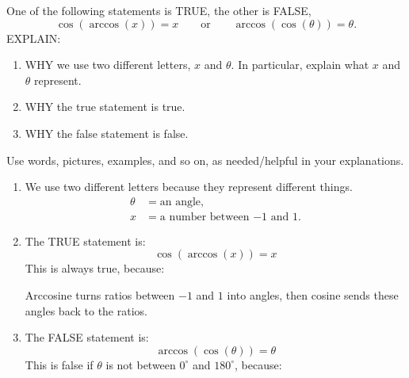 \documentclass[noauthor,nooutcomes,handout,hints]{ximera}
\begin{document}
\begin{question}
  One of the following statements is TRUE, the other is FALSE,
  \[
  \cos(\arccos(x)) = x \qquad \text{or} \qquad \arccos(\cos(\theta))
  =\theta.
  \]
  EXPLAIN:
  \begin{enumerate}
  \item WHY we use two different letters, $x$ and $\theta$. In
    particular, explain what $x$ and $\theta$ represent.
  \item WHY the true statement is true.
  \item WHY the false statement is false.
  \end{enumerate}
  Use words, pictures, examples, and so on, as needed/helpful in your
  explanations.
  \begin{freeResponse}
    \begin{enumerate}
    \item We use two different letters because they represent
      different things.
      \begin{align*}
        \theta &= \text{an angle},\\
        x &=\text{a number between $-1$ and $1$}.
      \end{align*}
    \item The TRUE statement is:
      \[
      \cos(\arccos(x)) = x
      \]
      This is always true, because:
      \begin{center}
      \end{center}
      Arccosine turns ratios between $-1$ and $1$ into angles, then
      cosine sends these angles back to the ratios.
    \item The FALSE statement is:
      \[
      \arccos(\cos(\theta)) = \theta
      \]
      This is false if $\theta$ is not between $0^\circ$ and
      $180^\circ$, because:
      \begin{center}
\end{center}
\end{enumerate}
\end{freeResponse}
\end{question}
\end{document}

